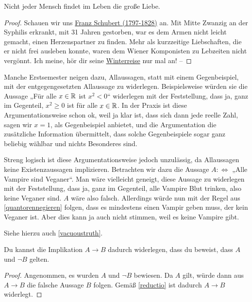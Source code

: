  
\begin{bsp}
    Nicht jeder Mensch findet im Leben die große Liebe.
\end{bsp}
\begin{proof}
    Schauen wir uns \href{https://de.wikipedia.org/wiki/Franz_Schubert}{Franz Schubert (1797-1828)} an. Mit Mitte Zwanzig an der Syphilis erkrankt, mit 31 Jahren gestorben, war es dem Armen nicht leicht gemacht, einen Herzenspartner zu finden. Mehr als kurzzeitige Liebschaften, die er nicht frei ausleben konnte, waren dem Wiener Komponisten zu Lebzeiten nicht vergönnt. Ich meine, hör dir seine \href{https://youtu.be/F6I6Y1LhMKo?t=1665}{Winterreise} nur mal an! --
\end{proof}


\begin{bem}
    Manche Erstsemester neigen dazu, Allaussagen, statt mit einem Gegenbeispiel, mit der entgegengesetzten Allaussage zu widerlegen. Beispielsweise würden sie die Aussage „Für alle $x\in \mathbb R$ ist $x^2<0$“ widerlegen mit der Feststellung, dass ja, ganz im Gegenteil, $x^2\ge 0$ ist für alle $x\in \mathbb R$. In der Praxis ist diese Argumentationsweise schon ok, weil ja klar ist, dass sich dann jede reelle Zahl, sagen wir $x=1$, als Gegenbeispiel anbietet, und die Argumentation die zusätzliche Information übermittelt, dass solche Gegenbeispiele sogar ganz beliebig wählbar und nichts Besonderes sind.

    Streng logisch ist diese Argumentationsweise jedoch unzulässig, da Allaussagen keine Existenzaussagen implizieren. Betrachten wir dazu die Aussage $A:\Leftrightarrow$ „Alle Vampire sind Veganer“. Man wäre vielleicht geneigt, diese Aussage zu widerlegen mit der Feststellung, dass ja, ganz im Gegenteil, alle Vampire Blut trinken, also keine Veganer sind. $A$ wäre also falsch. Allerdings würde nun mit der Regel aus \cref{quantorennegieren} folgen, dass es mindestens einen Vampir geben muss, der kein Veganer ist. Aber dies kann ja auch nicht stimmen, weil es keine Vampire gibt.

    Siehe hierzu auch \cref{vacuoustruth}.
\end{bem}


\begin{satz}
    Du kannst die Implikation $A\to B$ dadurch widerlegen, dass du beweist, dass $A$ und $\neg B$ gelten.
\end{satz}
\begin{proof}
    Angenommen, es wurden $A$ und $\neg B$ bewiesen. Da $A$ gilt, würde dann aus $A\to B$ die falsche Aussage $B$ folgen. Gemäß \cref{reductio} ist dadurch $A\to B$ widerlegt.
\end{proof}


